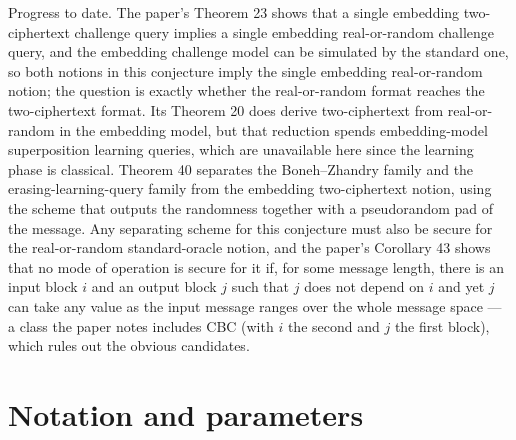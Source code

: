 \documentclass{aicr-conjecture}
\begin{document}
Progress to date. The paper's Theorem 23 shows that a single embedding
two-ciphertext challenge query implies a single embedding
real-or-random challenge query, and the embedding challenge model can be
simulated by the standard one, so both notions in this conjecture imply
the single embedding real-or-random notion; the question is exactly
whether the real-or-random format reaches the two-ciphertext format. Its
Theorem 20 does derive two-ciphertext from real-or-random in the
embedding model, but that reduction spends embedding-model superposition
learning queries, which are unavailable here since the learning phase is
classical. Theorem 40 separates the Boneh--Zhandry family and the
erasing-learning-query family from the embedding two-ciphertext notion,
using the scheme that outputs the randomness together with a
pseudorandom pad of the message. Any separating scheme for this
conjecture must also be secure for the real-or-random standard-oracle
notion, and the paper's Corollary 43 shows that no mode of operation is
secure for it if, for some message length, there is an input block $i$
and an output block $j$ such that $j$ does not depend on $i$ and yet $j$
can take any value as the input message ranges over the whole message
space --- a class the paper notes includes CBC (with $i$ the second and
$j$ the first block), which rules out the obvious candidates.

\section{Notation and parameters}\label{sec:notation}
\end{document}
